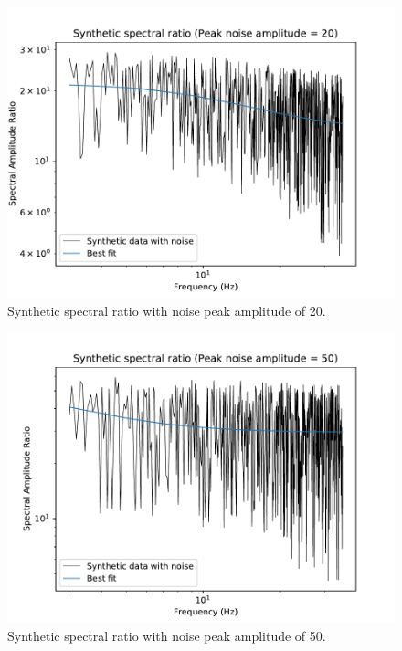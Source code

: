 \documentclass[11pt]{article}
\begin{document}
\begin{figure}[!htb]
    \centering
    \includegraphics[scale=0.7]{fig_mom_noise_3.pdf}
    \caption{Synthetic spectral ratio with noise peak amplitude of 20.}
\end{figure}
\begin{figure}[!htb]
    \centering
    \includegraphics[scale=0.7]{fig_mom_noise_4.pdf}
    \caption{Synthetic spectral ratio with noise peak amplitude of 50.}
\end{figure}
\end{document}
